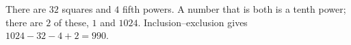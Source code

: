 There are $32$ squares and $4$ fifth powers. A number that is both is a tenth power; there are $2$ of these, $1$ and $1024$. Inclusion--exclusion gives $1024-32-4+2=\boxed{990}$.
